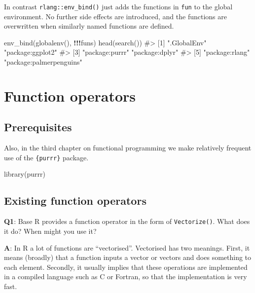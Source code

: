 \documentclass[
]{krantz}
\makeatletter
\newenvironment{Shaded}{\begin{snugshade}}{\end{snugshade}}
\newcommand{\CommentTok}[1]{\textcolor[rgb]{0.56,0.35,0.01}{\textit{#1}}}
\newcommand{\KeywordTok}[1]{\textcolor[rgb]{0.13,0.29,0.53}{\textbf{#1}}}
\newcommand{\NormalTok}[1]{#1}
\newcommand{\OperatorTok}[1]{\textcolor[rgb]{0.81,0.36,0.00}{\textbf{#1}}}
\newenvironment{kframe}{%
\medskip{}
\setlength{\fboxsep}{.8em}
 \def\at@end@of@kframe{}%
 \ifinner\ifhmode%
  \def\at@end@of@kframe{\end{minipage}}%
  \begin{minipage}{\columnwidth}%
 \fi\fi%
 \def\FrameCommand##1{\hskip\@totalleftmargin \hskip-\fboxsep
 \colorbox{shadecolor}{##1}\hskip-\fboxsep
     \hskip-\linewidth \hskip-\@totalleftmargin \hskip\columnwidth}%
 \MakeFramed {\advance\hsize-\width
   \@totalleftmargin\z@ \linewidth\hsize
   \@setminipage}}%
 {\par\unskip\endMakeFramed%
 \at@end@of@kframe}
\renewenvironment{Shaded}{\begin{kframe}}{\end{kframe}}
\renewcommand{\KeywordTok} [1]{\textcolor[rgb]{0.00,0.44,0.13}{{#1}}}
\renewcommand{\CommentTok} [1]{\textcolor[rgb]{0.38,0.63,0.69}{{#1}}}
\renewcommand{\NormalTok}  [1]{{#1}}
\makeatother
\begin{document}
In contrast \texttt{rlang::env\_bind()} just adds the functions in \texttt{fun} to the global environment. No further side effects are introduced, and the functions are overwritten when similarly named functions are defined.

\begin{Shaded}
\begin{Highlighting}[]
\KeywordTok{env_bind}\NormalTok{(}\KeywordTok{globalenv}\NormalTok{(), }\OperatorTok{!!!}\NormalTok{funs)}
\KeywordTok{head}\NormalTok{(}\KeywordTok{search}\NormalTok{())}
\CommentTok{#> [1] ".GlobalEnv"             "package:ggplot2"       }
\CommentTok{#> [3] "package:purrr"          "package:dplyr"         }
\CommentTok{#> [5] "package:rlang"          "package:palmerpenguins"}
\end{Highlighting}
\end{Shaded}

\hypertarget{function-operators}{%
\chapter{Function operators}\label{function-operators}}

\hypertarget{prerequisites-5}{%
\section*{Prerequisites}\label{prerequisites-5}}


Also, in the third chapter on functional programming we make relatively frequent use of the \texttt{\{purrr\}} package.

\begin{Shaded}
\begin{Highlighting}[]
\KeywordTok{library}\NormalTok{(purrr)}
\end{Highlighting}
\end{Shaded}


\hypertarget{existing-function-operators}{%
\section{Existing function operators}\label{existing-function-operators}}

\textbf{{Q1}}: Base R provides a function operator in the form of \texttt{Vectorize()}. What does it do? When might you use it?

\textbf{{A}}: In R a lot of functions are ``vectorised''. Vectorised has two meanings. First, it means (broadly) that a function inputs a vector or vectors and does something to each element. Secondly, it usually implies that these operations are implemented in a compiled language such as C or Fortran, so that the implementation is very fast.
\end{document}
